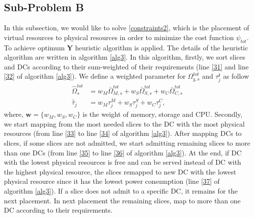 \documentclass[conference]{IEEEtran}
\begin{document}
\subsection{Sub-Problem B}
In this subsection, we would like to solve  \eqref{constraints2}, which is the placement of virtual resources to physical resources in order to minimize the cost function $\psi_{tot}$.
To achieve optimum $\boldsymbol{Y}$ heuristic algorithm is applied. The details of the heuristic algorithm are written in algorithm \eqref{alg3}. In this algorithm, firstly, we sort slices and DCs according to their sum-weighted of their requirements (line \ref{31} and line \ref{32} of algorithm \ref{alg3}).
We define a weighted parameter for $\Omega_{\mathfrak{z},s}^{tot}$ and $\tau_j^\mathfrak{z}$ as follow
\begin{equation}\label{wt}
\begin{split}
\hat{\Omega}_{s}^{tot} &= w_M \bar{\Omega}_{M,s}^{tot} + w_S \bar{\Omega}_{S,s}^{tot} + w_C \bar{\Omega}_{C,s}^{tot} \\
\hat{\tau}_j &= w_M \tau_{{j}}^M + w_S \tau_{{j}}^S + w_C \tau_{{j}}^C,
\end{split}
\end{equation}
where, $\boldsymbol{w} = \{w_M, w_S, w_C\}$ is the weight of memory, storage and CPU.
Secondly, we start mapping from the most needed slices to the DC with the most physical resources (from line \ref{33} to line \ref{34} of algorithm \ref{alg3}). After mapping DCs to slices, if some slices are not admitted, we start admitting remaining slices to more than one DCs (from line \ref{35} to line \ref{36} of algorithm \ref{alg3}). At the end, if DC with the lowest physical resources is free and can be served instead of DC with the highest physical resource, the slices remapped to new DC with the lowest physical resource since it has the lowest power consumption (line \ref{37} of algorithm \ref{alg3}).
If a slice does not admit to a specific DC, it remains for the next placement. In next placement the remaining slices, map to more than one DC according to their requirements.
\end{document}
